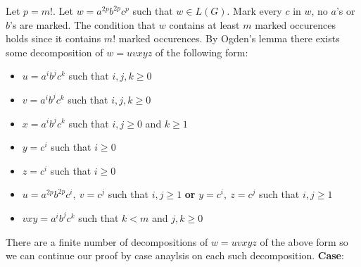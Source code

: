 \documentclass[12pt]{article}
\begin{document}
Let $p=m!$. Let $w = a^{2p}b^{2p}c^p$ such that $w \in L(G)$. Mark every $c$ in
$w$, no $a$'s or $b$'s are marked. The condition that $w$ contains at least $m$
marked occurences holds since it contains $m!$ marked occurences. By Ogden's
lemma there exists some decomposition of $w = uvxyz$ of the following form:
\begin{itemize}
\item $u=a^ib^jc^k$ such that $i,j,k\ge 0$
\item $v=a^ib^jc^k$ such that $i,j,k\ge 0$
\item $x=a^ib^jc^k$ such that $i,j\ge 0$ and $k\ge 1$
\item $y=c^i$ such that $i\ge 0$
\item $z=c^i$ such that $i\ge 0$
\item $u=a^{2p}b^{2p}c^i,\ v=c^j$ such that $i,j\ge 1$ \textbf{or}
$y=c^i,\ z=c^j$ such that $i,j\ge 1$
\item $vxy = a^ib^jc^k$ such that $k<m$ and $j,k\ge 0$
\end{itemize}
There are a finite number of decompositions of $w=uvxyz$ of the above form so we
can continue our proof by case anaylsis on each such decomposition.
\vspace{3mm}
\newline
\textbf{Case}:
\end{document}

